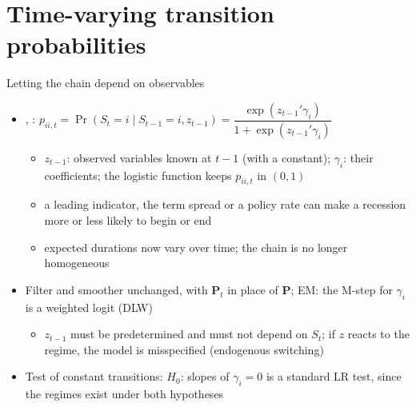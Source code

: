 \section{Time-varying transition probabilities}

\begin{frame}{Letting the chain depend on observables}
\itemsize{\small}
\begin{itemize}
    \item {}, : $p_{ii,t} = \Pr(S_t = i \mid S_{t-1} = i, z_{t-1}) = \dfrac{\exp(z_{t-1}'\gamma_i)}{1 + \exp(z_{t-1}'\gamma_i)}$
    \begin{itemize}
        \item $z_{t-1}$: observed variables known at $t - 1$ (with a constant); $\gamma_i$: their coefficients; the logistic function keeps $p_{ii,t}$ in $(0, 1)$
        \item a leading indicator, the term spread or a policy rate can make a recession more or less likely to begin or end
        \item expected durations now vary over time; the chain is no longer homogeneous
    \end{itemize}
    \item Filter and smoother unchanged, with $\mathbf{P}_t$ in place of $\mathbf{P}$; EM: the M-step for $\gamma_i$ is a weighted logit (DLW)
    \begin{itemize}
        \item $z_{t-1}$ must be predetermined and must not depend on $S_t$; if $z$ reacts to the regime, the model is misspecified (endogenous switching)
    \end{itemize}
    \item Test of constant transitions: $H_0$: slopes of $\gamma_i = 0$ is a standard LR test, since the regimes exist under both hypotheses
\end{itemize}
\end{frame}

